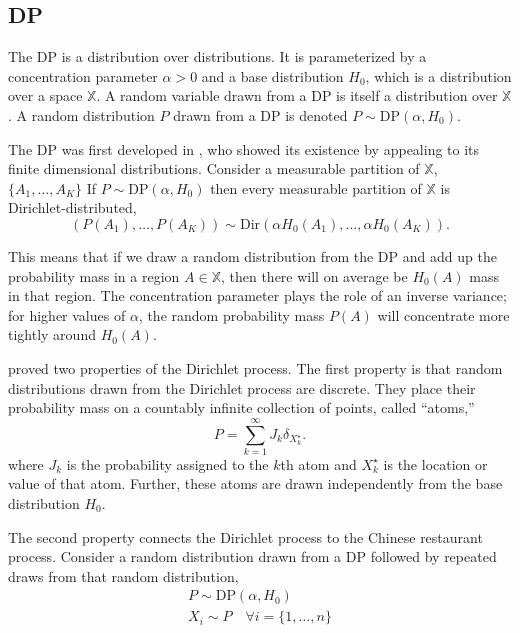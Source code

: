\subsection{\acrlong{DP}}

The \acrfull{DP} is a distribution over distributions. It is parameterized by a concentration parameter $\alpha > 0$ and a base distribution $H_0$, which is a distribution over a space $\mathbb{X}$. A random variable drawn from a \gls{DP} is itself a distribution over $\mathbb{X}$. A random distribution $P$ drawn from a \gls{DP} is denoted $P \sim \text{DP}(\alpha, H_0)$.

The \gls{DP} was first developed in \cite{ferguson73}, who showed its existence by appealing to its finite dimensional distributions. Consider a measurable partition of $\mathbb{X}$, $\{A_1,\dots,A_K\}$ If $P \sim \text{DP}(\alpha, H_0)$ then every measurable partition of $\mathbb{X}$ is Dirichlet-distributed,
$$(P(A_1), \dots , P(A_K)) \sim \text{Dir}(\alpha H_0(A_1), \dots , \alpha H_0(A_K)).$$

This means that if we draw a random distribution from the \gls{DP} and add up the probability mass in a region $A \in \mathbb{X}$, then there will on average be $H_0(A)$ mass in that region. The concentration parameter plays the role of an inverse variance; for higher values of $\alpha$, the random probability mass $P(A)$ will concentrate more tightly around $H_0(A)$.

\cite{ferguson73} proved two properties of the Dirichlet process. The first property is that random distributions drawn from the Dirichlet process are discrete. They place their probability mass on a countably infinite collection of points, called “atoms,”
\begin{equation} \label{eq:DP}
P = \sum_{k=1}^\infty{J_k \delta_{X_k^\star}}.
\end{equation}
where $J_k$ is the probability assigned to the $k$th atom and $X_k^\star$ is the location or value of that atom. Further, these atoms are drawn independently from the base distribution $H_0$.

The second property connects the Dirichlet process to the Chinese restaurant process. Consider a random distribution drawn from a DP followed by repeated draws from that random distribution,
\begin{gather}
P \sim \text{DP}(\alpha, H_0) \\
X_i \sim P \quad \forall i= \{1,\dots,n\} \label{eq:CRP}
\end{gather}

